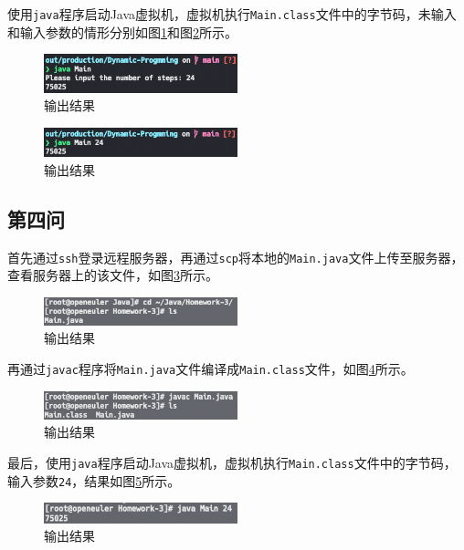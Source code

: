 \documentclass[11pt]{homework}
\begin{document}
使用\verb|java|程序启动Java虚拟机，虚拟机执行\verb|Main.class|文件中的字节码，未输入和输入参数的情形分别如图\ref{q3_output_2}和图\ref{q3_output_3}所示。
\begin{figure}
  \centering
  \includegraphics[width=0.5\textwidth]{q3_output_2}
  \caption{输出结果}
  \label{q3_output_2}
\end{figure}
\begin{figure}
  \centering
  \includegraphics[width=0.5\textwidth]{q3_output_3}
  \caption{输出结果}
  \label{q3_output_3}
\end{figure}

\subsection*{第四问}

首先通过\verb|ssh|登录远程服务器，再通过\verb|scp|将本地的\verb|Main.java|文件上传至服务器，查看服务器上的该文件，如图\ref{q4_output_1}所示。
\begin{figure}
  \centering
  \includegraphics[width=0.5\textwidth]{q4_output_1}
  \caption{输出结果}
  \label{q4_output_1}
\end{figure}

再通过\verb|javac|程序将\verb|Main.java|文件编译成\verb|Main.class|文件，如图\ref{q4_output_2}所示。
\begin{figure}
  \centering
  \includegraphics[width=0.5\textwidth]{q4_output_2}
  \caption{输出结果}
  \label{q4_output_2}
\end{figure}

最后，使用\verb|java|程序启动Java虚拟机，虚拟机执行\verb|Main.class|文件中的字节码，输入参数\verb|24|，结果如图\ref{q4_output_3}所示。
\begin{figure}
  \centering
  \includegraphics[width=0.5\textwidth]{q4_output_3}
  \caption{输出结果}
  \label{q4_output_3}
\end{figure}
\end{document}
